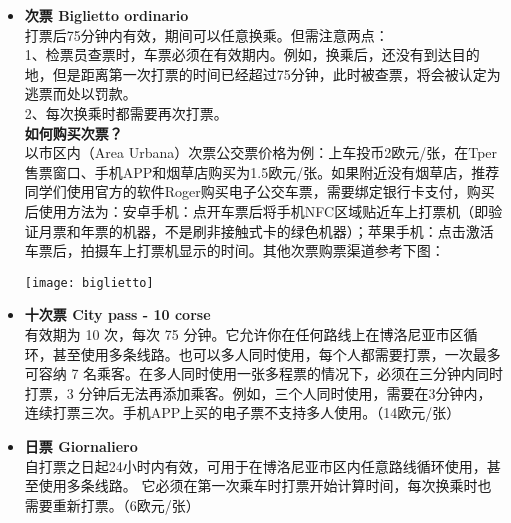 \begin{itemize}
\item  \textbf{次票 Biglietto ordinario}\\
打票后75分钟内有效，期间可以任意换乘。但需注意两点：\\
1、检票员查票时，车票必须在有效期内。例如，换乘后，还没有到达目的地，但是距离第一次打票的时间已经超过75分钟，此时被查票，将会被认定为逃票而处以罚款。\\
2、每次换乘时都需要再次打票。\\
\textbf{如何购买次票？}\\
以市区内（Area Urbana）次票公交票价格为例：上车投币2欧元/张，在Tper售票窗口、手机APP和烟草店购买为1.5欧元/张。如果附近没有烟草店，推荐同学们使用官方的软件Roger购买电子公交车票，需要绑定银行卡支付，购买后使用方法为：安卓手机：点开车票后将手机NFC区域贴近车上打票机（即验证月票和年票的机器，不是刷非接触式卡的绿色机器）；苹果手机：点击激活车票后，拍摄车上打票机显示的时间。其他次票购票渠道参考下图：

\texttt{[image: biglietto]}

\item  \textbf{十次票 City pass - 10 corse}\\
有效期为 10 次，每次 75 分钟。它允许你在任何路线上在博洛尼亚市区循环，甚至使用多条线路。也可以多人同时使用，每个人都需要打票，一次最多可容纳 7 名乘客。在多人同时使用一张多程票的情况下，必须在三分钟内同时打票，3 分钟后无法再添加乘客。例如，三个人同时使用，需要在3分钟内，连续打票三次。手机APP上买的电子票不支持多人使用。（14欧元/张）
\item  \textbf{日票 Giornaliero}\\
自打票之日起24小时内有效，可用于在博洛尼亚市区内任意路线循环使用，甚至使用多条线路。 它必须在第一次乘车时打票开始计算时间，每次换乘时也需要重新打票。（6欧元/张）


\end{itemize}
